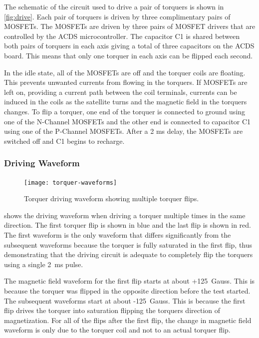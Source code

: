 The schematic of the circuit used to drive a pair of torquers is shown in \cref{fig:drive}. Each pair of torquers is driven by three complimentary pairs of \acp{MOSFET}.  The \acp{MOSFET} are driven by three pairs of \ac{MOSFET} drivers that are controlled by the \ac{ACDS} microcontroller. The capacitor C1 is shared between both pairs of torquers in each axis giving a total of three capacitors on the \ac{ACDS} board. This means that only one torquer in each axis can be flipped each second. 

In the idle state, all of the \acp{MOSFET} are off and the torquer coils are floating. This prevents unwanted currents from flowing in the torquers. If \acp{MOSFET} are left on, providing a current path between the coil terminals, currents can be induced in the coils as the satellite turns and the magnetic field in the torquers changes. To flip a torquer, one end of the torquer is connected to ground using one of the N-Channel \acp{MOSFET} and the other end is connected to capacitor C1 using one of the P-Channel \acp{MOSFET}. After a 2 ms delay, the \acp{MOSFET} are switched off and C1 begins to recharge.

\subsubsection{Driving Waveform}

\begin{figure}[htb!]
    \centering
    \texttt{[image: torquer-waveforms]}
    \caption{Torquer driving waveform showing multiple torquer flips.}
    \label{fig:driveWV}
\end{figure}

 shows the driving waveform when driving a torquer multiple times in the same direction. The first torquer flip is shown in blue and the last flip is shown in red. The first waveform is the only waveform that differs significantly from the subsequent waveforms because the torquer is fully saturated in the first flip, thus demonstrating that the driving circuit is adequate to completely flip the torquers using a single 2~ms pulse.

The magnetic field waveform for the first flip starts at about +125~Gauss. This is because the torquer was flipped in the opposite direction before the test started. The subsequent waveforms start at about -125~Gauss. This is because the first flip drives the torquer into saturation flipping the torquers direction of magnetization. For all of the flips after the first flip, the change in magnetic field waveform is only due to the torquer coil and not to an actual torquer flip.

